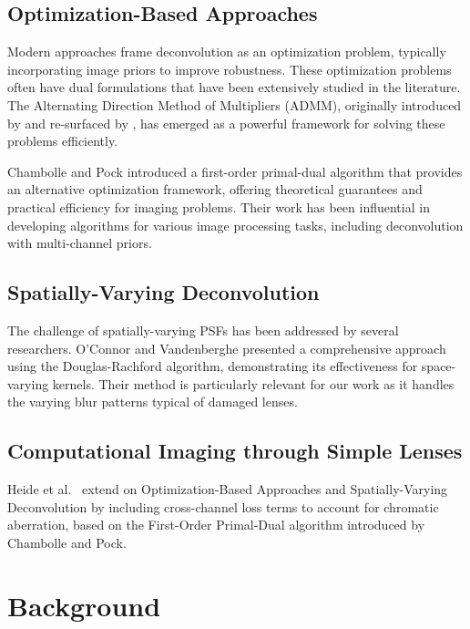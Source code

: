 \documentclass[sigconf]{acmart}
\begin{document}
\subsection{Optimization-Based Approaches}
Modern approaches frame deconvolution as an optimization problem, typically incorporating image priors to improve robustness. These optimization problems often have dual formulations that have been extensively studied in the literature. The Alternating Direction Method of Multipliers (ADMM), originally introduced by \cite{GlowinskiMarroco1975} and re-surfaced by \cite{ADMMBoyd}, has emerged as a powerful framework for solving these problems efficiently. 

Chambolle and Pock \cite{Chambolle2011AFP} introduced a first-order primal-dual algorithm that provides an alternative optimization framework, offering theoretical guarantees and practical efficiency for imaging problems. Their work has been influential in developing algorithms for various image processing tasks, including deconvolution with multi-channel priors.

\subsection{Spatially-Varying Deconvolution}
The challenge of spatially-varying PSFs has been addressed by several researchers. O'Connor and Vandenberghe \cite{oconnor} presented a comprehensive approach using the Douglas-Rachford algorithm, demonstrating its effectiveness for space-varying kernels. Their method is particularly relevant for our work as it handles the varying blur patterns typical of damaged lenses.

\subsection{Computational Imaging through Simple Lenses}
Heide et al.\ \cite{simplelens} extend on Optimization-Based Approaches and Spatially-Varying Deconvolution by including cross-channel loss terms to account for chromatic aberration, based on the First-Order Primal-Dual algorithm introduced by Chambolle and Pock\cite{Chambolle2011AFP}.

\section{Background}
\end{document}
